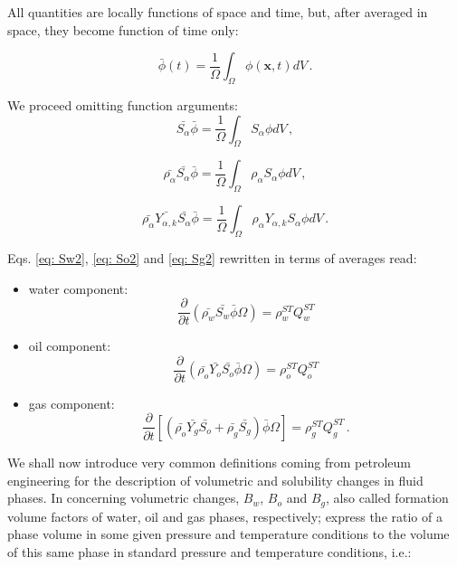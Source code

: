 \documentclass[authoryear,preprint,review,12pt]{elsarticle}
\begin{document}
All quantities are locally functions of space and time, but, after averaged in space, they become function of time only:

\begin{equation}
\bar{\phi} (t) = \frac{1}{\Omega}\int_{\Omega}\phi \left(\mathbf{x},t\right) dV \, .
\end{equation}

We proceed omitting function arguments:
\begin{equation}
\bar{S_\alpha}\bar{\phi} = \frac{1}{\Omega}\int_{\Omega}S_\alpha \phi dV \, ,
\end{equation}

\begin{equation}
\bar{\rho_\alpha}\bar{S_\alpha}\bar{\phi} = \frac{1}{\Omega}\int_{\Omega}\rho_\alpha S_\alpha \phi dV \, ,
\end{equation}

\begin{equation}
\bar{\rho_\alpha}\bar{Y_{\alpha,k}}\bar{S_\alpha}\bar{\phi} = \frac{1}{\Omega}\int_{\Omega}\rho_\alpha Y_{\alpha,k} S_\alpha \phi dV \, .
\end{equation}

Eqs. \eqref{eq: Sw2}, \eqref{eq: So2} and \eqref{eq: Sg2} rewritten in terms of averages read:

\begin{itemize}
\item water component:
\begin{equation}\label{eq: Sw3}
\frac{\partial}{\partial t} \left( \bar{\rho_w}\bar{S_w}\bar{\phi} \Omega \right) = \rho_w^{ST}Q_w^{ST}
\end{equation}

\item oil component:
\begin{equation}\label{eq: So3}
\frac{\partial}{\partial t} \left( \bar{\rho_o}\bar{Y_o}\bar{S_o}\bar{\phi} \Omega \right) = \rho_o^{ST}Q_o^{ST}
\end{equation}

\item gas component:
\begin{equation}\label{eq: Sg3}
\frac{\partial}{\partial t} \left[\left( \bar{\rho_o}\bar{Y_g} \bar{S_o} + \bar{\rho_g} \bar{S_g}  \right) \bar{\phi} \Omega\right] = \rho_g^{ST}Q_g^{ST} \, .
\end{equation}
\end{itemize}

We shall now introduce very common definitions coming from petroleum engineering for the description of volumetric and solubility changes in fluid phases. In concerning volumetric changes, $B_w$, $B_o$ and $B_g$, also called formation volume factors of water, oil and gas phases, respectively; express the ratio of a phase volume in some given pressure and temperature conditions to the volume of this same phase in standard pressure and temperature conditions, i.e.:
\end{document}
